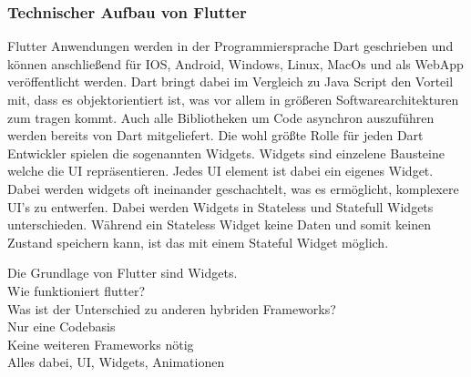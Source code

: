 \subsubsection{Technischer Aufbau von Flutter}
Flutter Anwendungen werden in der Programmiersprache Dart geschrieben und können anschließend für IOS, Android, Windows, Linux, MacOs und als WebApp 
veröffentlicht werden. Dart bringt dabei im Vergleich zu Java Script den Vorteil mit, dass es objektorientiert ist, was vor allem in größeren 
Softwarearchitekturen zum tragen kommt. Auch alle Bibliotheken um Code asynchron auszuführen werden bereits von Dart mitgeliefert. 
Die wohl größte Rolle für jeden Dart Entwickler spielen die sogenannten Widgets. Widgets sind einzelene Bausteine welche die UI repräsentieren. 
Jedes UI element ist dabei ein eigenes Widget. Dabei werden widgets oft ineinander geschachtelt, was es ermöglicht, komplexere UI’s zu entwerfen. 
Dabei werden Widgets in Stateless und Statefull Widgets unterschieden. Während ein Stateless Widget keine Daten und somit keinen Zustand speichern kann, 
ist das mit einem Stateful Widget möglich.

Die Grundlage von Flutter sind Widgets. \\
Wie funktioniert flutter?   \\
Was ist der Unterschied zu anderen hybriden Frameworks?  \\ 
Nur eine Codebasis \\
Keine weiteren Frameworks nötig\\
Alles dabei, UI, Widgets, Animationen\\

